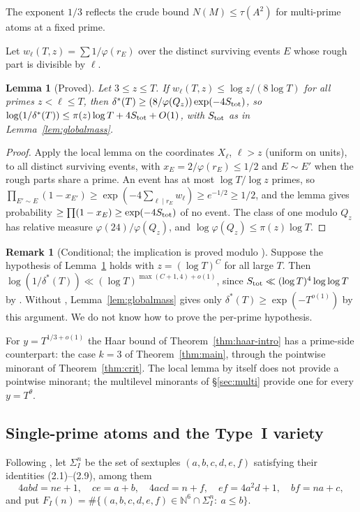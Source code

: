 \documentclass[11pt,reqno]{amsart}
\newtheorem{lemma}[theorem]{Lemma}
\theoremstyle{definition}
\newtheorem{remark}[theorem]{Remark}
\begin{document}
The exponent $1/3$ reflects the crude bound $N(M)\le\tau(A^2)$ for multi-prime
atoms at a fixed prime.

Let $w_\ell(T,z)=\sum1/\varphi(r_E)$ over the distinct surviving events $E$ whose
rough part is divisible by $\ell$.

\begin{lemma}[Proved]\label{lem:ppl}
Let $3\le z\le T$.  If $w_\ell(T,z)\le\log z/(8\log T)$ for all primes
$z<\ell\le T$, then
$\delta^*(T)\ge(8/\varphi(Q_z))\exp(-4S_{\rm tot})$, so
$\log(1/\delta^*(T))\le\pi(z)\log T+4S_{\rm tot}+O(1)$, with $S_{\rm tot}$ as in
Lemma~\ref{lem:globalmass}.
\end{lemma}

\begin{proof}
Apply the local lemma \cite[Lemma~5.1.1]{AS} on the coordinates $X_\ell$,
$\ell>z$ (uniform on units), to all distinct surviving events, with
$x_E=2/\varphi(r_E)\le1/2$ and $E\sim E'$ when the rough parts share a prime.  An
event has at most $\log T/\log z$ primes, so
$\prod_{E'\sim E}(1-x_{E'})\ge\exp(-4\sum_{\ell\mid r_E}w_\ell)\ge e^{-1/2}\ge1/2$, and
the lemma gives probability $\ge\prod(1-x_E)\ge\exp(-4S_{\rm tot})$ of no event.
The class of one modulo $Q_z$ has relative measure $\varphi(24)/\varphi(Q_z)$, and
$\log\varphi(Q_z)\le\pi(z)\log T$.
\end{proof}

\begin{remark}[Conditional; the implication is proved modulo {\cite[Prop.~1.4]{ET}}]\label{rem:pp}
Suppose the hypothesis of Lemma~\ref{lem:ppl} holds with $z=(\log T)^C$ for all
large $T$.  Then $\log(1/\delta^*(T))\ll(\log T)^{\max(C+1,4)+o(1)}$, since
$S_{\rm tot}\ll(\log T)^4\log\log T$ by \cite[Prop.~1.4]{ET}.  Without \cite{ET},
Lemma~\ref{lem:globalmass} gives only $\delta^*(T)\ge\exp(-T^{o(1)})$ by this
argument.  We do not know how to prove the per-prime hypothesis.
\end{remark}

For $y=T^{1/3+o(1)}$ the Haar bound of Theorem~\ref{thm:haar-intro} has a
prime-side counterpart: the case $k=3$ of Theorem~\ref{thm:main}, through the
pointwise minorant of Theorem~\ref{thm:crit}.  The local lemma by itself does
not provide a pointwise minorant; the multilevel minorants of
\S\ref{sec:multi} provide one for every $y=T^{\theta}$.

\subsection*{Single-prime atoms and the Type~I variety}
Following \cite[\S2]{ET}, let $\Sigma_I^n$ be the set of sextuples
$(a,b,c,d,e,f)$ satisfying their identities (2.1)--(2.9), among them
\[
 4abd=ne+1,\quad ce=a+b,\quad 4acd=n+f,\quad ef=4a^2d+1,\quad bf=na+c,
\]
and put $F_I(n)=\#\{(a,b,c,d,e,f)\in\mathbb N^6\cap\Sigma_I^n:\ a\le b\}$.
\end{document}
